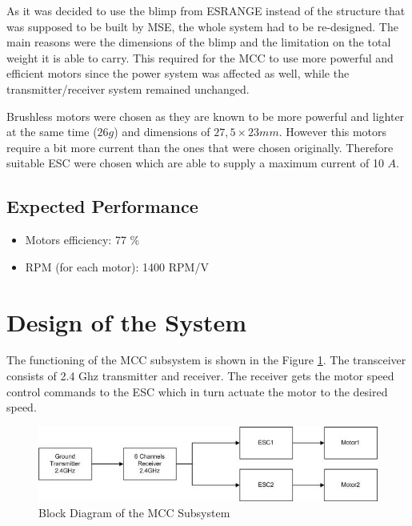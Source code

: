 As it was decided to use the blimp from ESRANGE instead of the structure that was supposed to be built by MSE, the whole system had to be re-designed. The main reasons were the dimensions of the blimp and the limitation on the total weight it is able to carry. This required for the MCC to use more powerful and efficient motors since the power system was affected as well, while the transmitter/receiver system remained unchanged.

Brushless motors were chosen as they are known to be more powerful and lighter at the same time ($26g$) and dimensions of $27,5\times 23 mm$. However this motors require a bit more current than the ones that were chosen originally. Therefore suitable ESC were chosen which are able to supply a maximum current of 10 $A$. 



\subsection{Expected Performance}

\begin{itemize}
\item Motors efficiency: 77 \% 
\item RPM (for each motor): 1400 RPM/V
\end{itemize}


\section{Design of the System}

The functioning of the MCC subsystem is shown in the Figure \ref{fig:design_block}. The transceiver consists of 2.4 Ghz transmitter and receiver. The receiver gets the motor speed control commands to the ESC which in turn actuate the motor to the desired speed.

\begin{figure}[bht]
\centering
\includegraphics[scale=0.8]{figures/blockdiagram.jpg}
\caption{Block Diagram of the MCC Subsystem}
\label{fig:design_block}
\end{figure}

